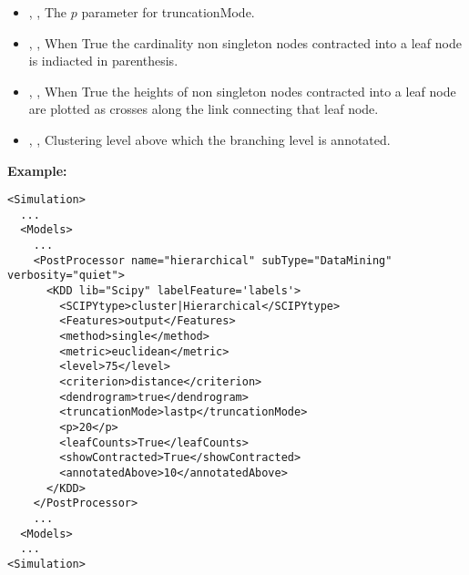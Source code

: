 \begin{itemize}
  \item {},              ,     The $p$ parameter for truncationMode.
  \item {},     , When True the cardinality non singleton nodes contracted into a leaf node is indiacted in
                                                                     parenthesis.
  \item {}, , When True the heights of non singleton nodes contracted into a leaf node are plotted as
                                                                     crosses along the link connecting that leaf node.
  \item {}, ,  Clustering level above which the branching level is annotated.
\end{itemize}

\textbf{Example:}
\begin{lstlisting}[style=XML,morekeywords={subType}]
<Simulation>
  ...
  <Models>
    ...
    <PostProcessor name="hierarchical" subType="DataMining" verbosity="quiet">
      <KDD lib="Scipy" labelFeature='labels'>
        <SCIPYtype>cluster|Hierarchical</SCIPYtype>
        <Features>output</Features>
        <method>single</method>
        <metric>euclidean</metric>
        <level>75</level>
        <criterion>distance</criterion>
        <dendrogram>true</dendrogram>
        <truncationMode>lastp</truncationMode>
        <p>20</p>
        <leafCounts>True</leafCounts>
        <showContracted>True</showContracted>
        <annotatedAbove>10</annotatedAbove>
      </KDD>
    </PostProcessor>
    ...
  <Models>
  ...
<Simulation>
\end{lstlisting}


